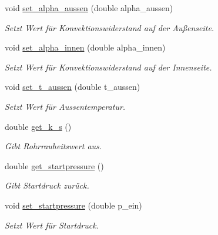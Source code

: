 \begin{DoxyCompactItemize}
\mbox{\label{class_rohr_ae6e604082fdb43a35bcdc74478ced8a7}} 
void \hyperlink{class_rohr_ae6e604082fdb43a35bcdc74478ced8a7}{set\+\_\+alpha\+\_\+aussen} (double alpha\+\_\+aussen)
\begin{DoxyCompactList}\small\item\em Setzt Wert für Konvektionswiderstand auf der Außenseite. \end{DoxyCompactList}\item 
\mbox{\label{class_rohr_aed25a50fcf5c735e51693303d8b41663}} 
void \hyperlink{class_rohr_aed25a50fcf5c735e51693303d8b41663}{set\+\_\+alpha\+\_\+innen} (double alpha\+\_\+innen)
\begin{DoxyCompactList}\small\item\em Setzt Wert für Konvektionswiderstand auf der Innenseite. \end{DoxyCompactList}\item 
\mbox{\label{class_rohr_a92be37f04575328b6b15de5ab2e511a9}} 
void \hyperlink{class_rohr_a92be37f04575328b6b15de5ab2e511a9}{set\+\_\+t\+\_\+aussen} (double t\+\_\+aussen)
\begin{DoxyCompactList}\small\item\em Setzt Wert für Aussentemperatur. \end{DoxyCompactList}\item 
\mbox{\label{class_rohr_a653e53a000dd4ed025d1adbdb83f7859}} 
double \hyperlink{class_rohr_a653e53a000dd4ed025d1adbdb83f7859}{get\+\_\+k\+\_\+s} ()
\begin{DoxyCompactList}\small\item\em Gibt Rohrrauheitswert aus. \end{DoxyCompactList}\item 
\mbox{\label{class_rohr_ad93033ce4a63458e188cfc9d8771836e}} 
double \hyperlink{class_rohr_ad93033ce4a63458e188cfc9d8771836e}{get\+\_\+startpressure} ()
\begin{DoxyCompactList}\small\item\em Gibt Startdruck zurück. \end{DoxyCompactList}\item 
\mbox{\label{class_rohr_ac9d6974bc17fde3cba4b67fb571c7ab7}} 
void \hyperlink{class_rohr_ac9d6974bc17fde3cba4b67fb571c7ab7}{set\+\_\+startpressure} (double p\+\_\+ein)
\begin{DoxyCompactList}\small\item\em Setzt Wert für Startdruck. \end{DoxyCompactList}\end{DoxyCompactItemize}



